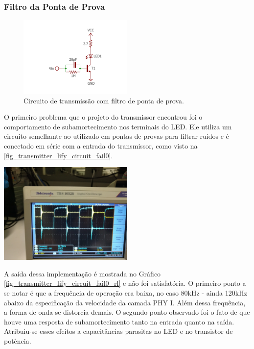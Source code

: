 	\subsubsection{Filtro da Ponta de Prova}
	\begin{figure}[h]
		\caption{\label{fig_transmitter_lify_circuit_fail0}Circuito de transmissão com filtro de ponta de prova.}
		\centering		%
		\includegraphics[width=0.5\textwidth, trim={2cm 1cm 2cm 2cm}, clip]{circuits/transmitter_fail0.pdf}
	\end{figure}
	O primeiro problema que o projeto do transmissor encontrou foi o comportamento de subamortecimento nos terminais do LED. Ele utiliza um circuito semelhante ao utilizado em pontas de provas para filtrar ruídos e é conectado em série com a entrada do transmissor, como visto na \autoref{fig_transmitter_lify_circuit_fail0}.
	\begin{chart}[h]
		\caption{\label{fig_transmitter_lify_circuit_fail0_rl}Comportamento do circuito de transmissão com filtro de ponta de prova em série com a entrada. A onda azul é saída do gerador de funções enquanto a onda amarela é a tensão submetida ao LED. Observa-se o comportamento de subamortecimento em ambas.}
		\centering		%
		\includegraphics[width=0.5\textwidth, trim={30cm 0cm 2cm 40cm}, clip]{circuits/photos/TX_probe_result.jpg}
	\end{chart}

	A saída dessa implementação é mostrada no Gráfico \ref{fig_transmitter_lify_circuit_fail0_rl} e não foi satisfatória. O primeiro ponto a se notar é que a frequência de operação era baixa, no caso 80kHz - ainda 120kHz abaixo da especificação da velocidade da camada PHY I. Além dessa frequência, a forma de onda se distorcia demais. O segundo ponto observado foi o fato de que houve uma resposta de subamortecimento tanto na entrada quanto na saída. Atribuiu-se esses efeitos a capacitâncias parasitas no LED e no transistor de potência.

